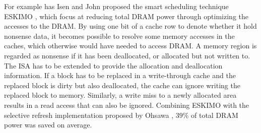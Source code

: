 For example has Isen and John proposed the smart scheduling technique ESKIMO \cite{eskimo}, which focus at reducing total DRAM power through optimizing the accesses to the DRAM. By using one bit of a cache row to denote whether it hold nonsense data, it becomes possible to resolve some memory accesses in the caches, which otherwise would have needed to access DRAM. A memory region is regarded as nonsense if it has been deallocated, or allocated but not written to. The ISA has to be extended to provide the allocation and deallocation information. If a block has to be replaced in a write-through cache and the replaced block is dirty but also deallocated, the cache can ignore writing the replaced block to memory. Similarly, a write miss to a newly allocated area results in a read access that can also be ignored. Combining ESKIMO with the selective refresh implementation proposed by Ohsawa \cite{ohsawa}, $39\%$ of total DRAM power was saved on average.

